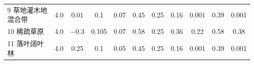 \begin{landscape}
\begin{table}[htbp]
\begin{tabular}{@{}lcccccccccc@{}}
    9 草地灌木地混合带     & 4.0        & \num{ 0.01  }                                                                       & 0.1                                                                                                             & 0.07                                                                                                            & 0.45                                                                                                            & 0.25                                                                                                            & 0.16                                                                                                            & 0.001                                                                                                           & 0.39                                                                                                            & 0.001                                                                                                           \\
    10 稀疏草原        & 4.0        & \num{ -0.3  }                                                                       & 0.105                                                                                                           & 0.07                                                                                                            & 0.58                                                                                                            & 0.25                                                                                                            & 0.36                                                                                                            & 0.22                                                                                                            & 0.58                                                                                                            & 0.38                                                                                                            \\
    11 落叶阔叶林       & 4.0        & \num{ 0.25  }                                                                       & 0.1                                                                                                             & 0.05                                                                                                            & 0.45                                                                                                            & 0.25                                                                                                            & 0.16                                                                                                            & 0.001                                                                                                           & 0.39                                                                                                            & 0.001                                                                                                           \\

\end{tabular}
\end{table}
\end{landscape}
